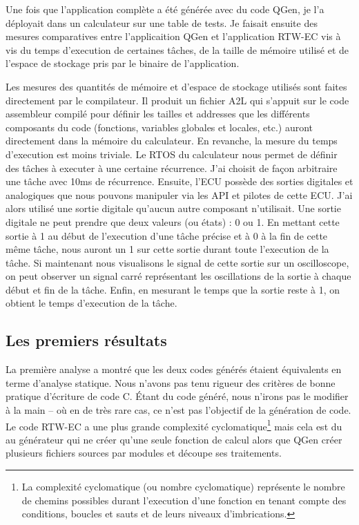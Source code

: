 Une fois que l'application complète a été générée avec du code QGen, je l'a
déployait dans un calculateur sur une table de tests. Je faisait ensuite des
mesures comparatives entre l'applicaition QGen et l'application
RTW-EC\up{\circledR} vis à vis du temps d'execution de certaines tâches, de la
taille de mémoire utilisé et de l'espace de stockage pris par le binaire de
l'application.

Les mesures des quantités de mémoire et d'espace de stockage utilisés sont faites
directement par le compilateur. Il produit un fichier A2L qui s'appuit sur le
code assembleur compilé pour définir les tailles et addresses que les différents
composants du code (fonctions, variables globales et locales, etc.) auront directement
dans la mémoire du calculateur.
En revanche, la mesure du temps d'execution est moins triviale. Le RTOS du
calculateur nous permet de définir des tâches à executer à une certaine
récurrence. J'ai choisit de façon arbitraire une tâche avec 10ms de récurrence.
Ensuite, l'ECU possède des sorties digitales et analogiques que nous pouvons manipuler via les API et
pilotes de cette ECU. J'ai alors utilisé une sortie digitale qu'aucun autre
composant n'utilisait. Une sortie digitale ne peut prendre que deux valeurs (ou
états) : 0 ou 1. En mettant cette sortie à 1 au début de l'execution d'une tâche
précise et à 0 à la fin de cette même tâche, nous auront un 1 sur cette
sortie durant toute l'execution de la tâche. Si maintenant nous visualisons le
signal de cette sortie sur un oscilloscope, on peut observer un signal carré
représentant les oscillations de la sortie à chaque début et fin de la tâche.
Enfin, en mesurant le temps que la sortie reste à 1, on obtient le temps
d'execution de la tâche.

\subsection{Les premiers résultats}
La première analyse a montré que les deux codes générés étaient équivalents en
terme d'analyse statique. Nous n'avons pas tenu rigueur des critères de bonne
pratique d'écriture de code C. \'Etant du code généré, nous n'irons pas le
modifier à la main -- où en de très rare cas, ce n'est pas l'objectif de la
génération de code. Le code RTW-EC\up{\circledR} a une plus grande complexité
cyclomatique\footnote{La complexité cyclomatique (ou nombre cyclomatique)
représente le nombre de \og chemins \fg{} possibles durant l'execution d'une
fonction en tenant compte des conditions, boucles et sauts et de leurs niveaux
d'imbrications.} mais cela est du au générateur qui ne créer qu'une seule
fonction de calcul alors que QGen créer plusieurs fichiers sources par modules
et découpe ses traitements.

